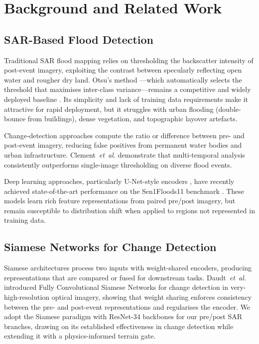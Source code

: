 \documentclass[12pt]{article}
\newcommand{\etal}{\textit{et~al.}}
\begin{document}
\section{Background and Related Work}
\label{sec:related}

\subsection{SAR-Based Flood Detection}

Traditional SAR flood mapping relies on thresholding the backscatter
intensity of post-event imagery, exploiting the contrast between specularly
reflecting open water and rougher dry land.  Otsu's method
\cite{otsu1979threshold}—which automatically selects the threshold that
maximises inter-class variance—remains a competitive and widely deployed
baseline \cite{martinis2015towards}.  Its simplicity and lack of training data
requirements make it attractive for rapid deployment, but it struggles with
urban flooding (double-bounce from buildings), dense vegetation, and
topographic layover artefacts.

Change-detection approaches compute the ratio or difference between pre- and
post-event imagery, reducing false positives from permanent water bodies and
urban infrastructure.  Clement~\etal \cite{clement2018multi} demonstrate that
multi-temporal analysis consistently outperforms single-image thresholding on
diverse flood events.

Deep learning approaches, particularly U-Net-style encoders
\cite{ronneberger2015unet}, have recently achieved state-of-the-art
performance on the Sen1Floods11 benchmark \cite{bonafilia2020sen1floods11}.
These models learn rich feature representations from paired pre/post imagery,
but remain susceptible to distribution shift when applied to regions not
represented in training data.

\subsection{Siamese Networks for Change Detection}

Siamese architectures \cite{bromley1993signature} process two inputs with
weight-shared encoders, producing representations that are compared or fused
for downstream tasks.  Daudt~\etal \cite{daudt2018fully} introduced Fully
Convolutional Siamese Networks for change detection in very-high-resolution
optical imagery, showing that weight sharing enforces consistency between
the pre- and post-event representations and regularises the encoder.
We adopt the Siamese paradigm with ResNet-34 \cite{he2016deep} backbones
for our pre/post SAR branches, drawing on its established effectiveness in
change detection while extending it with a physics-informed terrain gate.
\end{document}
